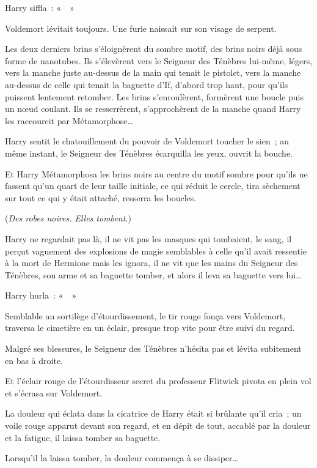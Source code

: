 Harry siffla~: «~~»

Voldemort lévitait toujours.
Une furie naissait sur son visage de serpent.

Les deux derniers brins s'éloignèrent du sombre motif, des brins noirs déjà sous forme de nanotubes.
Ils s'élevèrent vers le Seigneur des Ténèbres lui-même, légers, vers la manche juste au-dessus de la main qui tenait le pistolet, vers la manche au-dessus de celle qui tenait la baguette d'If, d'abord trop haut, pour qu'ils puissent lentement retomber.
Les brins s'enroulèrent, formèrent une boucle puis un nœud coulant.
Ils se resserrèrent, s'approchèrent de la manche quand Harry les raccourcit par Métamorphose…

Harry sentit le chatouillement du pouvoir de Voldemort toucher le sien~; au même instant, le Seigneur des Ténèbres écarquilla les yeux, ouvrit la bouche.

Et Harry Métamorphosa les brins noirs au centre du motif sombre pour qu'ils ne fassent qu'un quart de leur taille initiale, ce qui réduit le cercle, tira sèchement sur tout ce qui y était attaché, resserra les boucles.

(\emph{Des robes noires.
Elles tombent.})

Harry ne regardait pas là, il ne vit pas les masques qui tombaient, le sang, il perçut vaguement des explosions de magie semblables à celle qu'il avait ressentie à la mort de Hermione mais les ignora, il ne vit que les mains du Seigneur des Ténèbres, son arme et sa baguette tomber, et alors il leva sa baguette vers lui…

Harry hurla~: «~~»

Semblable au sortilège d'étourdissement, le tir rouge fonça vers Voldemort, traversa le cimetière en un éclair, presque trop vite pour être suivi du regard.

Malgré ses blessures, le Seigneur des Ténèbres n'hésita pas et lévita subitement en bas à droite.

Et l'éclair rouge de l'étourdisseur secret du professeur Flitwick pivota en plein vol et s'écrasa sur Voldemort.

La douleur qui éclata dans la cicatrice de Harry était si brûlante qu'il cria~; un voile rouge apparut devant son regard, et en dépit de tout, accablé par la douleur et la fatigue, il laissa tomber sa baguette.

Lorsqu'il la laissa tomber, la douleur commença à se dissiper…
